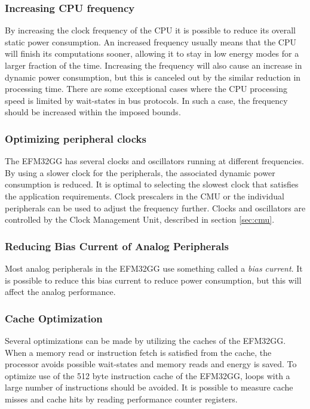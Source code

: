 \subsubsection{Increasing CPU frequency}
By increasing the clock frequency of the CPU it is possible to reduce its overall static power consumption. An increased frequency usually means that the CPU will finish its computations sooner, allowing it to stay in low energy modes for a larger fraction of the time. Increasing the frequency will also cause an increase in dynamic power consumption, but this is canceled out by the similar reduction in processing time. There are some exceptional cases where the CPU processing speed is limited by wait-states in bus protocols. In such a case, the frequency should be increased within the imposed bounds.\cite{efm32-energy-optimization}


\subsubsection{Optimizing peripheral clocks}
The EFM32GG has several clocks and oscillators running at different frequencies. By using a slower clock for the peripherals, the associated dynamic power consumption is reduced. It is optimal to selecting the slowest clock that satisfies the application requirements. Clock prescalers in the CMU or the individual peripherals can be used to adjust the frequency further. Clocks and oscillators are controlled by the Clock Management Unit, described in section \ref{sec:cmu}.\cite{efm32-energy-optimization} 


\subsubsection{Reducing Bias Current of Analog Peripherals}
Most analog peripherals in the EFM32GG use something called a \emph{bias current}. It is possible to reduce this bias current to reduce power consumption, but this will affect the analog performance.\cite{efm32-energy-optimization}


\subsubsection{Cache Optimization}
Several optimizations can be made by utilizing the caches of the EFM32GG. When a memory read or instruction fetch is satisfied from the cache, the processor avoids possible wait-states and memory reads and energy is saved. To optimize use of the 512 byte instruction cache of the EFM32GG, loops with a large number of instructions should be avoided. It is possible to measure cache misses and cache hits by reading performance counter registers.\cite{efm32-energy-optimization}


